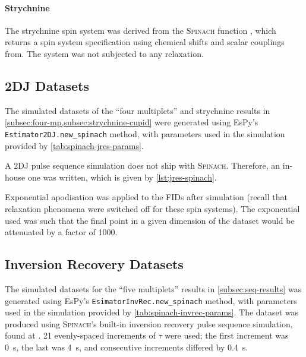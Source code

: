 \paragraph{Strychnine}
The strychnine spin system was derived from
the \textsc{Spinach} function , which returns a
spin system specification using chemical shifts and scalar couplings
from\cite[Appendix 5]{Berger2004}. The system was not subjected to any relaxation.



\subsection{\acs{2DJ} Datasets}
The simulated datasets of the ``four multiplets'' and strychnine results in
\cref{subsec:four-mp,subsec:strychnine-cupid} were generated
using \ac{EsPy}'s \texttt{Estimator2DJ.new_spinach} method, with
parameters used in the simulation provided by
\cref{tab:spinach-jres-params}.



A \ac{2DJ} pulse sequence simulation does not ship with \textsc{Spinach}.
Therefore, an in-house one was written, which is given by
\cref{lst:jres-spinach}.


Exponential apodisation was applied to the \acp{FID} after simulation
(recall that relaxation phenomena were switched off for these spin systems).
The exponential used was such that the final point in a given dimension of the
dataset would be attenuated by a factor of 1000.

\subsection{Inversion Recovery Datasets}
\label{subsec:invrec-datasets}
The simulated datasets for the ``five multiplets'' results in
\cref{subsec:seq-results} was generated using \ac{EsPy}'s
\texttt{EsimatorInvRec.new_spinach} method, with
parameters used in the simulation provided by
\cref{tab:spinach-invrec-params}.
 The dataset was produced using \textsc{Spinach}'s built-in
inversion recovery pulse sequence simulation, found at
. 21 evenly-spaced increments of
$\tau$ were used; the first increment was \qty{0}{\second}, the last was
\qty{4}{\second}, and consecutive increments differed by \qty{0.4}{\second}.

